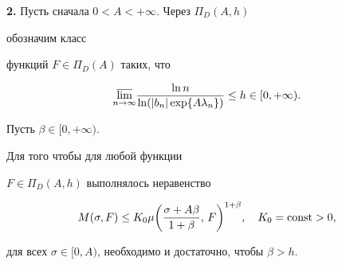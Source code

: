  


{\bf 2.} Пусть сначала $0<A<+\infty$. Через $\Pi_D(A,h)$ 


обозначим класс 


функций $F\in \Pi_D(A)$ таких, что 


$$ 


\underset{n\to\infty}{\varlimsup} 


\frac{\ln n}{\ln(|b_n|\exp\{A\lambda_n\})}\le h 


\in[0,+\infty). 


$$ 


 


\begin{thm} Пусть $\beta\in[0,+\infty)$. 


Для того чтобы для любой функции 


$F\in \Pi_D(A,h)$ выполнялось неравенство 


\begin{equation} 


M(\sigma,F)\le K_0\mu 


\biggl(\frac{\sigma+A\beta}{1+\beta},\,F \biggr)^{1+\beta}, 


\quad K_0=\const >0, 


\end{equation} 


для всех $\sigma\in[0,A)$, необходимо и достаточно, чтобы $\beta>h$. 


\end{thm} 


 


